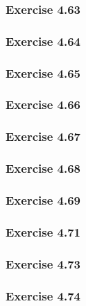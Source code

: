 \subsubsection{Exercise 4.63}


\subsubsection{Exercise 4.64}


\subsubsection{Exercise 4.65}


\subsubsection{Exercise 4.66}


\subsubsection{Exercise 4.67}


\subsubsection{Exercise 4.68}


\subsubsection{Exercise 4.69}


\subsubsection{Exercise 4.71}


\subsubsection{Exercise 4.73}


\subsubsection{Exercise 4.74}

